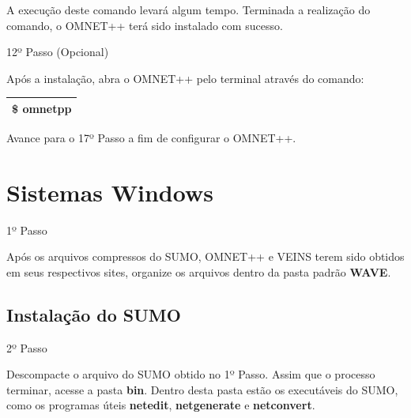 \documentclass[
12pt,				%
openright,			%
oneside,			%
a4paper,			%
brazil,				%
]{abntex2}
\begin{document}
{\begin{anexosenv}
		            \par A execução deste comando levará algum tempo. Terminada a realização do comando, o OMNET++ terá sido instalado com sucesso.
                    

                	\begin{description}
		                \item[12º Passo (Opcional)]
		            \end{description}
		            \par Após a instalação, abra o OMNET++ pelo terminal através do comando:
		
		            \begin{table}[H]
			            \renewcommand{\arraystretch}{1.5}
		                \begin{tabular}{|p{15.5cm}|}
			                \hline
                            \$ omnetpp \\
			                \hline
			            \end{tabular}
		            \end{table}
		            
		            \par Avance para o 17º Passo a fim de configurar o OMNET++.
				
        	\section{Sistemas Windows}
        	
            	\begin{description}
		            \item[1º Passo]
		        \end{description}
		        \par Após os arquivos compressos do SUMO, OMNET++ e VEINS terem sido obtidos em seus respectivos sites, organize os arquivos dentro da pasta padrão \textbf{WAVE}.

            	\subsection{Instalação do SUMO}
            	
            	    \begin{description}
		                \item[2º Passo]
		            \end{description}
		            \par Descompacte o arquivo do SUMO obtido no 1º Passo. Assim que o processo terminar, acesse a pasta \textbf{bin}. Dentro desta pasta estão os executáveis do SUMO, como os programas úteis \textbf{netedit}, \textbf{netgenerate} e \textbf{netconvert}.
		

\end{anexosenv}}
\end{document}
